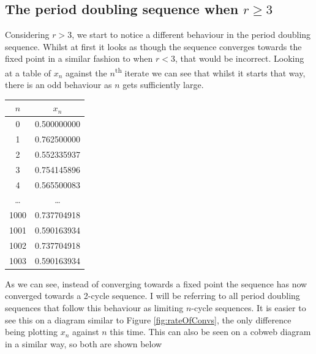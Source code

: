 \documentclass[12pt]{article}
\begin{document}
\subsection{The period doubling sequence when $r\ge3$}
Considering $r>3$, we start to notice a different behaviour in the period doubling sequence. Whilst at first it looks as though the sequence converges towards the fixed point in a similar fashion to when $r<3$, that would be incorrect. Looking at a table of $x_n$ against the $n$\textsuperscript{th} iterate we can see that whilst it starts that way, there is an odd behaviour as $n$ gets sufficiently large.
	\begin{table}[H]
	\begin{center}
		\begin{tabular}{|c|c|}
			\hline
			 $n$  &    $x_n$    \\ \hline\hline
			  0   & 0.500000000 \\ \hline
			  1   & 0.762500000 \\ \hline
			  2   & 0.552335937 \\ \hline
			  3   & 0.754145896 \\ \hline
			  4   & 0.565500083 \\ \hline
			\dots &    \dots    \\ \hline
			1000  & 0.737704918 \\ \hline
			1001  & 0.590163934 \\ \hline
			1002  & 0.737704918 \\ \hline
			1003  & 0.590163934 \\ \hline
		\end{tabular}
	\end{center}
\end{table}
As we can see, instead of converging towards a fixed point the sequence has now converged towards a 2-cycle sequence. I will be referring to all period doubling sequences that follow this behaviour as limiting $n$-cycle sequences.
It is easier to see this on a diagram similar to Figure \ref{fig:rateOfConvs}, the only difference being plotting $x_n$ against $n$ this time. This can also be seen on a cobweb diagram in a similar way, so both are shown below
\end{document}
